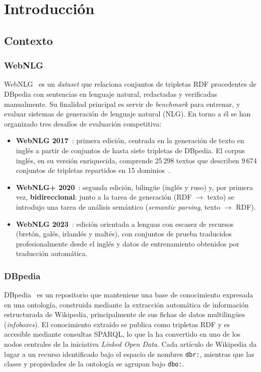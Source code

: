
\chapter{Introducción}

\section{Contexto}

\subsection{WebNLG}

WebNLG~\cite{Gardent2017,Gardent2017acl} es un \textit{dataset} que relaciona
conjuntos de tripletas RDF procedentes de DBpedia con sentencias en lenguaje
natural, redactadas y verificadas manualmente. Su finalidad principal es servir
de \textit{benchmark} para entrenar, y evaluar sistemas de
generación de lenguaje natural (NLG). En torno a él se han organizado tres
desafíos de evaluación competitiva:

\begin{itemize}
	\item \textbf{WebNLG 2017}~\cite{Gardent2017}: primera edición, centrada en la
	      generación de texto en inglés a partir de conjuntos de hasta siete tripletas de
	      DBpedia. El corpus inglés, en su versión enriquecida, comprende 25\,298 textos
	      que describen 9\,674 conjuntos de tripletas repartidos en 15
	      dominios~\cite{CastroFerreira2019}.
	\item \textbf{WebNLG+ 2020}~\cite{CastroFerreira2020}: segunda edición, bilingüe
          (inglés y
	      ruso) y, por primera vez, \textbf{bidireccional}: junto a la tarea de
	      generación (RDF $\rightarrow$ texto) se introdujo una tarea de análisis
	      semántico (\textit{semantic parsing}, texto $\rightarrow$ RDF).
	\item \textbf{WebNLG 2023}~\cite{Cripwell2023}: edición orientada a lenguas con
	      escasez de recursos (bretón, galés, irlandés y maltés), con conjuntos de prueba
	      traducidos profesionalmente desde el inglés y datos de entrenamiento obtenidos
	      por traducción automática.
\end{itemize}

\subsection{DBpedia}

DBpedia~\cite{Auer2007,Lehmann2015} es un repositorio que manteniene una base de
conocimiento expresada en una ontología, construida mediante la extracción automática de
información estructurada de
Wikipedia, principalmente de sus fichas de datos multilingües (\textit{infoboxes}). El
conocimiento extraído se publica como tripletas RDF y es accesible mediante consultas SPARQL, lo que la ha convertido en uno
de los nodos centrales de la iniciativa \textit{Linked Open Data}. Cada
artículo de Wikipedia da lugar a un recurso identificado bajo el espacio de
nombres \texttt{dbr:}, mientras que las clases y propiedades de la ontología se
agrupan bajo \texttt{dbo:}.

